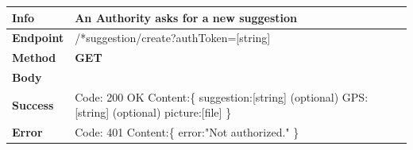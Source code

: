 \begin{table}[H]
\begin{tabular}{|l|p{}|}
\hline
\textbf{Info}             & An Authority asks for a new suggestion                                                        \\ \hline
\textbf{Endpoint}    &  /*suggestion/create?authToken=[string] \\ \hline
\textbf{Method}         &   \textbf{GET}                                                                            \\ \hline

\textbf{Body}  & 
                    \\ \hline
                    
\textbf{Success} &  Code: 200 OK \newline
                    Content:\{\newline 
            suggestion:[string]\newline
            (optional) GPS:[string]\newline
        (optional) picture:[file]\newline
                    \}\\ \hline
\textbf{Error} &  
                 
                  Code: 401 \newline
                  Content:\{\newline
                  error:"Not authorized." \newline\}\newline
                 
                \\\hline

\end{tabular}
\end{table}







